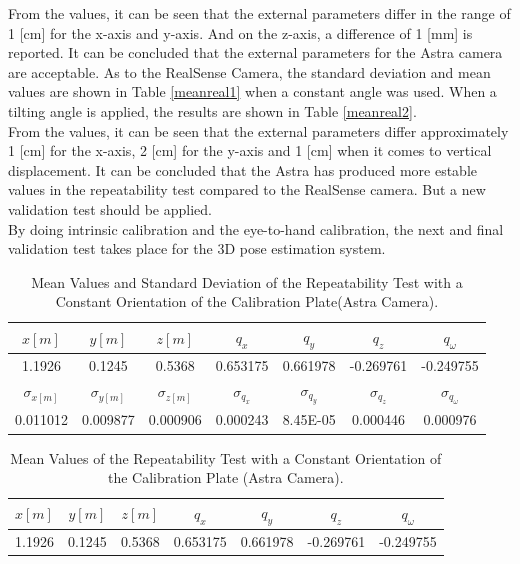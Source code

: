 From the values, it can be seen that the external parameters differ in the range of 1 [cm] for the x-axis and y-axis. And on the z-axis, a difference of 1 [mm] is reported. It can be concluded that the external parameters for the Astra camera are acceptable.
As to the RealSense Camera, the standard deviation and mean values are shown in Table \ref{meanreal1} when a constant angle was used. When a tilting angle is applied, the results are shown in Table \ref{meanreal2}.\\
From the values, it can be seen that the external parameters differ approximately 1 [cm] for the x-axis, 2 [cm] for the y-axis and 1 [cm]  when it comes to vertical displacement.  It can be concluded that the Astra has produced more estable values in the repeatability test compared to the RealSense camera. But a new validation test should be applied. \\
By doing intrinsic calibration and the eye-to-hand calibration, the next and final validation test takes place for the 3D pose estimation system.


\begin{table}[ht]
\renewcommand{\arraystretch}{1.3}
\caption{Mean Values and Standard Deviation of the Repeatability Test with a Constant Orientation of the Calibration Plate(Astra Camera).}
\label{meanastra1}
\centering
\begin{tabular}{|c|c|c|c|c|c|c|}
\hline
$x[m]$ & $y[m]$ & $z[m]$ & $q_{x}$ & $q_{y}$ & $q_{z}$ &$q_{\omega}$ \\
\hline
1.1926 & 0.1245 & 0.5368& 0.653175&	0.661978&	-0.269761&	-0.249755 \\
\hline
\hline
$\sigma_{x[m]}$ & $\sigma_{y[m]}$ & $\sigma_{z[m]}$ & $\sigma_{q_{x}}$ & $\sigma_{q_{y}}$ & $\sigma_{q_{z}}$ &$\sigma_{q_{\omega}}$ \\
\hline
0.011012&	0.009877	&0.000906&0.000243&	8.45E-05&	0.000446&	0.000976\\
\hline
\end{tabular}
\end{table}


\iffalse
\begin{table}[ht]
\renewcommand{\arraystretch}{1.3}
\caption{Mean Values of the Repeatability Test with a Constant Orientation of the Calibration Plate (Astra Camera).}
\label{meanastra1}
\centering
\begin{tabular}{|c||c||c||c||c||c||c|}
\hline
$x[m]$ & $y[m]$ & $z[m]$ & $q_{x}$ & $q_{y}$ & $q_{z}$ &$q_{\omega}$ \\
\hline
1.1926 & 0.1245 & 0.5368& 0.653175&	0.661978&	-0.269761&	-0.249755 \\
\hline
\end{tabular}
\end{table}


